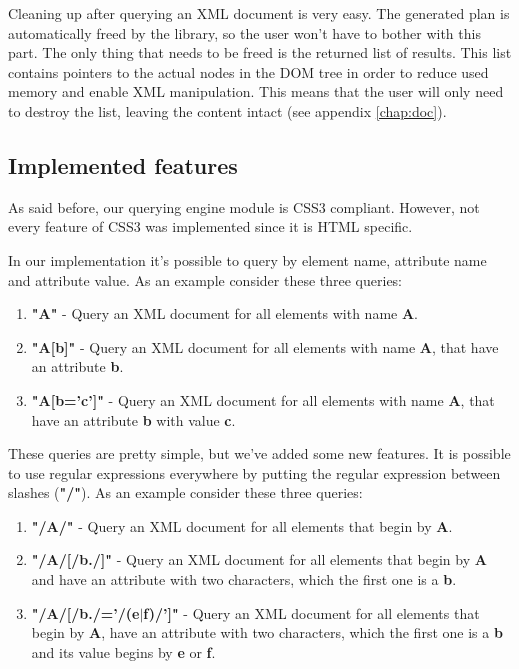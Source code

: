 \documentclass[a4paper]{report}
\begin{document}
	Cleaning up after querying an XML document is very easy. The generated plan is automatically freed by the library, so the user won't have to bother with this part. The only thing that needs to be freed is the returned list of
	results. This list contains pointers to the actual nodes in the DOM tree in order to reduce used memory and enable XML manipulation. This means that the user will only need to destroy the list, leaving the content intact
	(see appendix \ref{chap:doc}).

	\subsection{Implemented features}	
		As said before, our querying engine module is CSS3 compliant. However, not every feature of CSS3 was implemented since it is HTML specific. 
		
		In our implementation it's possible to query by element name, attribute name and attribute value. As an example consider these three queries:
		
			\begin{enumerate}
				\item \textbf{"A"} - Query an XML document for all elements with name \textbf{A}.\\
				\item \textbf{"A[b]"} - Query an XML document for all elements with name \textbf{A}, that have an attribute \textbf{b}.\\
				\item \textbf{"A[b='c']"} - Query an XML document for all elements with name \textbf{A}, that have an attribute \textbf{b} with value \textbf{c}.\\
			\end{enumerate}

		These queries are pretty simple, but we've added some new features. It is possible to use regular expressions everywhere by putting the regular expression between slashes (\textbf{"/"}).
		As an example consider these three queries:
		
			\begin{enumerate}
				\item \textbf{"/A/"} - Query an XML document for all elements that begin by \textbf{A}.\\
				\item \textbf{"/A/[/b./]"} - Query an XML document for all elements that begin by \textbf{A} and have an attribute with two characters, which the first one is a \textbf{b}.\\
				\item \textbf{"/A/[/b./='/(e$|$f)/']"} - Query an XML document for all elements that begin by \textbf{A}, have an attribute with two characters, which the first one is a \textbf{b} and its value begins by \textbf{e} or
									       \textbf{f}.\\
			\end{enumerate}
			
\end{document}
